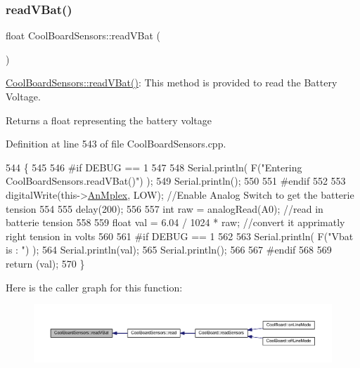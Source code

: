 \subsubsection{\texorpdfstring{read\+V\+Bat()}{readVBat()}}
{\footnotesize\ttfamily float Cool\+Board\+Sensors\+::read\+V\+Bat (\begin{DoxyParamCaption}{ }\end{DoxyParamCaption})}

\hyperlink{class_cool_board_sensors_a6944b6ea7bce8e2fce1b434acfd9d5f3}{Cool\+Board\+Sensors\+::read\+V\+Bat()}\+: This method is provided to read the Battery Voltage.

\begin{DoxyReturn}{Returns}
a float representing the battery voltage 
\end{DoxyReturn}


Definition at line 543 of file Cool\+Board\+Sensors.\+cpp.


\begin{DoxyCode}
544 \{
545 
546 \textcolor{preprocessor}{#if DEBUG == 1}
547 
548     Serial.println( F(\textcolor{stringliteral}{"Entering CoolBoardSensors.readVBat()"}) );
549     Serial.println();
550 
551 \textcolor{preprocessor}{#endif}
552 
553     digitalWrite(this->\hyperlink{class_cool_board_sensors_a12ef28b1046219e0aee10bf64e28c4a5}{AnMplex}, LOW);                            \textcolor{comment}{//Enable Analog Switch to get the
       batterie tension}
554     
555     delay(200);
556     
557     \textcolor{keywordtype}{int} raw = analogRead(A0);                                    \textcolor{comment}{//read in batterie tension}
558     
559     \textcolor{keywordtype}{float} val = 6.04 / 1024 * raw;                               \textcolor{comment}{//convert it apprimatly right tension in
       volts}
560     
561 \textcolor{preprocessor}{#if DEBUG == 1}
562 
563     Serial.println( F(\textcolor{stringliteral}{"Vbat is : "}) );
564     Serial.println(val);
565     Serial.println();
566 
567 \textcolor{preprocessor}{#endif}
568 
569     \textcolor{keywordflow}{return} (val);   
570 \}
\end{DoxyCode}
Here is the caller graph for this function\+:\nopagebreak
\begin{figure}[H]
\begin{center}
\leavevmode
\includegraphics[width=350pt]{de/d46/class_cool_board_sensors_a6944b6ea7bce8e2fce1b434acfd9d5f3_icgraph}
\end{center}
\end{figure}
\mbox{\label{class_cool_board_sensors_a406307ffd70272282d91479c7ed8d66f}} 
